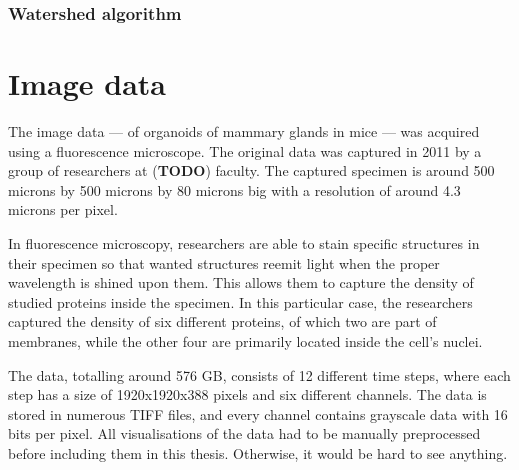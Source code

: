 \documentclass[
  digital,     %
  oneside,     %
  nosansbold,  %
  nocolorbold, %
  lof,         %
  lot,         %
]{fithesis4}
\begin{document}
\subsection{Watershed algorithm}



\chapter{Image data}

The image data --- of organoids of mammary glands in mice --- was acquired using
a fluorescence microscope. The original data was captured in 2011 by a group of
researchers at (\textbf{TODO}) faculty. The captured specimen is around 500
microns by 500 microns by 80 microns big with a resolution of around 4.3 microns
per pixel.

In fluorescence microscopy, researchers are able to stain specific structures in
their specimen so that wanted structures reemit light when the proper wavelength
is shined upon them. This allows them to capture the density of studied proteins
inside the specimen. In this particular case, the researchers captured the
density of six different proteins, of which two are part of membranes, while the
other four are primarily located inside the cell's nuclei.

The data, totalling around 576 GB, consists of 12 different time steps, where
each step has a size of 1920x1920x388 pixels and six different channels. The
data is stored in numerous TIFF files, and every channel contains grayscale data
with 16 bits per pixel. All visualisations of the data had to be manually
preprocessed before including them in this thesis. Otherwise, it would be hard
to see anything.
\end{document}
